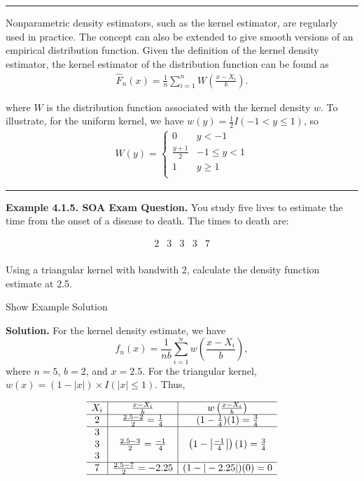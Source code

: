 \documentclass[]{book}
\theoremstyle{definition}
\theoremstyle{definition}
\theoremstyle{definition}
\theoremstyle{remark}
\begin{document}
\begin{center}\rule{0.5\linewidth}{\linethickness}\end{center}

Nonparametric density estimators, such as the kernel estimator, are
regularly used in practice. The concept can also be extended to give
smooth versions of an empirical distribution function. Given the
definition of the kernel density estimator, the kernel estimator of the
distribution function can be found as \[\begin{aligned}
\hat{F}_n(x) = \frac{1}{n} \sum_{i=1}^n W\left(\frac{x-X_i}{b}\right).\end{aligned}\]

where \(W\) is the distribution function associated with the kernel
density \(w\). To illustrate, for the uniform kernel, we have
\(w(y) = \frac{1}{2}I(-1 < y \le 1)\), so \[\begin{aligned}
W(y) =
\begin{cases}
0 &            y<-1\\
\frac{y+1}{2}& -1 \le y < 1 \\
1 & y \ge 1 \\
\end{cases}\end{aligned}\]

\begin{center}\rule{0.5\linewidth}{\linethickness}\end{center}

\textbf{Example 4.1.5. SOA Exam Question.} You study five lives to
estimate the time from the onset of a disease to death. The times to
death are:

\[\begin{array}{ccccc}
2 & 3 & 3 & 3 & 7  \\
\end{array}\]

Using a triangular kernel with bandwith \(2\), calculate the density
function estimate at 2.5.

Show Example Solution

\hypertarget{toggleExampleSelect.1.5}{}
\textbf{Solution.} For the kernel density estimate, we have
\[f_n(x) = \frac{1}{nb} \sum_{i=1}^n w\left(\frac{x-X_i}{b}\right),\]
where \(n=5\), \(b=2\), and \(x=2.5\). For the triangular kernel,
\(w(x) = (1-|x|)\times I(|x| \le 1)\). Thus,

\[\begin{array}{c|c|c}
\hline
X_i & \frac{x-X_i}{b} & w\left(\frac{x-X_i}{b} \right) \\
\hline 
2 & \frac{2.5-2}{2}=\frac{1}{4} &  (1-\frac{1}{4})(1) = \frac{3}{4} \\
\hline
3 & & \\
3 & \frac{2.5-3}{2}=\frac{-1}{4} & \left(1-\left| \frac{-1}{4} \right| \right)(1) = \frac{3}{4} \\
3 & & \\
\hline
7 & \frac{2.5-7}{2}=-2.25 & (1-|-2.25|)(0) = 0\\
\hline
\end{array}\]
\end{document}
